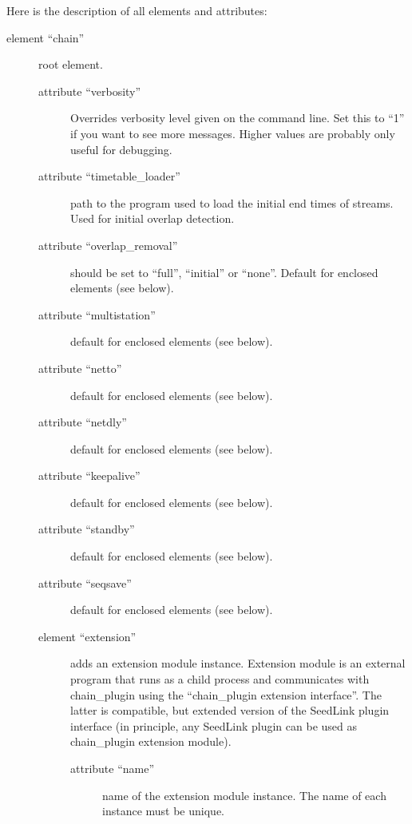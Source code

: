 \documentclass[11pt,a4paper,titlepage]{article}
\begin{document}
Here is the description of all elements and attributes:
\begin{description}
\item[element ``chain''] root element.

\begin{description}
\item[attribute ``verbosity''] Overrides verbosity level given on the
command line. Set this to ``1'' if you want to see more messages. Higher
values are probably only useful for debugging.

\item[attribute ``timetable\_loader''] path to the program used to load the
initial end times of streams. Used for initial overlap detection.

\item[attribute ``overlap\_removal'' ] should be set to ``full'',
``initial'' or ``none''. Default for enclosed elements (see below).

\item[attribute ``multistation'' ] default for enclosed elements
(see below).

\item[attribute ``netto'' ] default for enclosed elements (see
below).

\item[attribute ``netdly'' ] default for enclosed elements (see
below).

\item[attribute ``keepalive'' ] default for enclosed elements (see
below).

\item[attribute ``standby'' ] default for enclosed elements (see
below).

\item[attribute ``seqsave'' ] default for enclosed elements (see
below).

\item[element ``extension''] adds an extension module instance. Extension
module is an external program that runs as a child process and communicates
with chain\_plugin using the ``chain\_plugin extension interface''. The
latter is compatible, but extended version of the SeedLink plugin interface
(in principle, any SeedLink plugin can be used as chain\_plugin extension
module).

\begin{description}
\item[attribute ``name''] name of the extension module instance. The name
of each instance must be unique.


\end{description}
\end{description}
\end{description}
\end{document}
